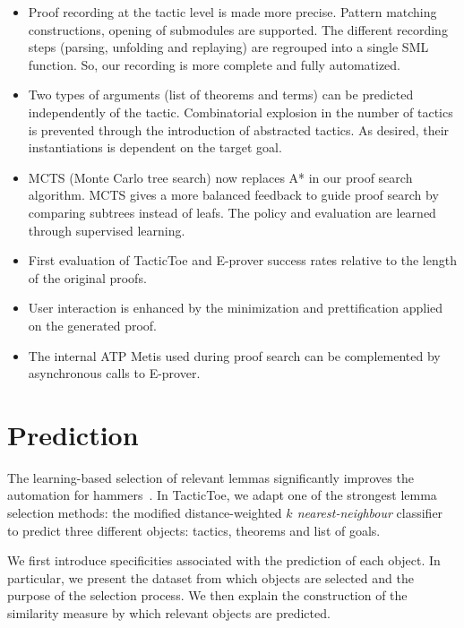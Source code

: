 \documentclass[runningheads,a4paper,draft]{svjour3}
\newcommand{\todoi}[1]{\todo[inline]{#1}}
\def\eprover{\textsf{E-prover}\xspace}
\def\sml{\textsf{SML}\xspace}
\def\metis{\textsf{Metis}\xspace}
\def\tactictoe{\textsf{TacticToe}\xspace}
\begin{document}
\todoi{add prediction of 3 kinds of things}
\begin{itemize}
\item Proof recording at the tactic level is made more precise. Pattern 
matching constructions, opening of submodules are supported. The different 
recording steps (parsing, unfolding and replaying) are regrouped into a single 
\sml function. So, our recording is more complete and fully automatized.
\item Two types of arguments (list of theorems and terms) can be predicted 
independently of the tactic. Combinatorial explosion in the number of tactics 
is prevented through the introduction of abstracted tactics. As desired, their 
instantiations is dependent on the target goal.
\item MCTS (Monte Carlo tree search) now replaces A* in our proof search 
algorithm. MCTS gives a more balanced feedback to guide proof search by 
comparing subtrees instead of leafs. The policy and evaluation are learned 
through supervised learning.

\item First evaluation of \tactictoe and \eprover success rates relative to 
the length of the original proofs.
\item User interaction is enhanced by the minimization and prettification 
applied on the generated proof.
\item The internal ATP \metis used during proof search can be complemented 
by asynchronous calls to \eprover.
\end{itemize}

\section{Prediction}\label{s:prediction}
The learning-based selection of relevant lemmas significantly improves the 
automation for hammers~\cite{BlanchetteGKKU16}. In \tactictoe, we adapt 
one of the strongest lemma selection 
methods: the modified distance-weighted \emph{$k$ nearest-neighbour} 
classifier~\cite{ckju-pxtp13,DudaniS76} to predict three different objects: 
 tactics, theorems and list of goals. 

We first introduce specificities associated with the prediction of each object. 
In particular, we present the dataset from which objects are selected and the 
purpose of the selection process. 
We then explain the construction of the similarity measure by which relevant 
objects are predicted.
\end{document}
